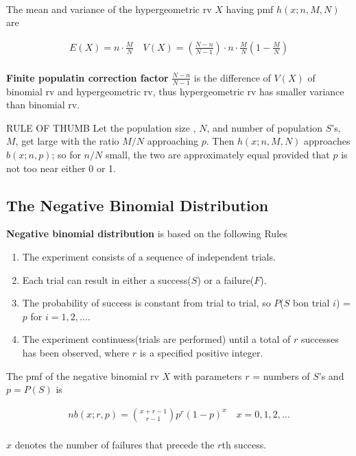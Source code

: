\begin{proposition}
    ~\\
    The mean and variance of the hypergeometric rv $X$ having pmf $h(x;n,M,N)$ are 

    \begin{align*}
        E(X) = n\cdot\frac{M}{N}\quad V(X) = \left(\frac{N-n}{N-1}\right)\cdot n\cdot\frac{M}{N}\left(1-\frac{M}{N}\right)\\
    \end{align*}

    \textbf{Finite populatin correction factor} $\frac{N-n}{N-1}$ is the difference of $V(X)$ of binomial rv and hypergeometric rv, thus hypergeometric rv has smaller variance than binomial rv.
\end{proposition}

\begin{theorem}{RULE OF THUMB}
    Let the population size , $N$, and number of population $S$'s, $M$, get large with the ratio $M/N$ approaching $p$. Then $h(x;n,M,N)$ approaches $b(x;n,p)$; so for $n/N$ small, the two are approximately equal provided that $p$ is not too near either 0 or 1. 
\end{theorem}

\subsection{The Negative Binomial Distribution}

\begin{proposition}
    \textbf{Negative binomial distribution} is based on the following Rules

    \begin{enumerate}
        \item The experiment consists of a sequence of independent trials.
        \item Each trial can result in either a success($S$) or a failure($F$).
        \item The probability of success is constant from trial to trial, so $P$($S$ bon trial $i$) = $p$ for $i = 1, 2, \dots$.
        \item The experiment continuess(trials are performed) until a total of $r$ successes has been observed, where $r$ is a specified positive integer.
    \end{enumerate}
\end{proposition}

\begin{proposition}
    The pmf of the negative binomial rv $X$ with parameters $r$ = numbers of $S$'s and $p = P(S)$ is
    
    \begin{align*}
        nb(x;r,p) = \binom{x+r-1}{r-1} p^r(1-p)^x\quad x=0,1,2,\dots \\
    \end{align*}

    $x$ denotes the number of failures that precede the $r$th success.
\end{proposition}

